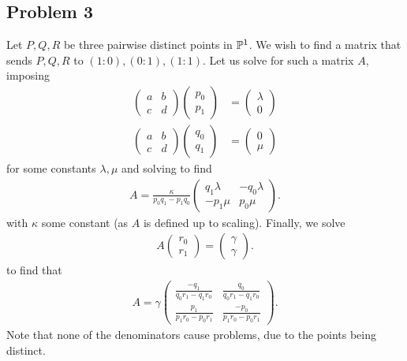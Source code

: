 \documentclass{../../mathnotes}
\begin{document}
\subsection*{Problem 3}

Let $P,Q,R$ be three pairwise distinct points in $\mathbb{P}^1$. We wish to find a matrix that sends $P,Q,R$ to
$(1:0),(0:1),(1:1)$. Let us solve for such a matrix $A$, imposing
\begin{align*}
    \begin{pmatrix}a&b\\c&d\end{pmatrix}\begin{pmatrix}p_0\\p_1\end{pmatrix}&=\begin{pmatrix}\lambda\\0\end{pmatrix}\\
    \begin{pmatrix}a&b\\c&d\end{pmatrix}\begin{pmatrix}q_0\\q_1\end{pmatrix}&=\begin{pmatrix}0\\\mu\end{pmatrix}
\end{align*}
for some constants $\lambda,\mu$ and solving to find
\begin{align*}
    A=\frac{\kappa}{p_0q_1-p_1q_0}\begin{pmatrix} q_1\lambda&-q_0\lambda\\-p_1\mu&p_0\mu\end{pmatrix}.
\end{align*}
with $\kappa$ some constant (as $A$ is defined up to scaling). Finally, we solve
\begin{align*}
    A
        \begin{pmatrix}
            r_0\\r_1
        \end{pmatrix}
        = \begin{pmatrix}
            \gamma\\\gamma
        \end{pmatrix}.
\end{align*}
to find that
\begin{align*}
    A=\gamma\begin{pmatrix}\frac{-q_1}{q_0r_1-q_1r_0}&\frac{q_0}{q_0r_1-q_1r_0}\\\frac{p_1}{p_1r_0-p_0r_1}&\frac{-p_0}{p_1r_0-p_0r_1}\end{pmatrix}.
\end{align*}
Note that none of the denominators cause problems, due to the points being distinct.
\end{document}
